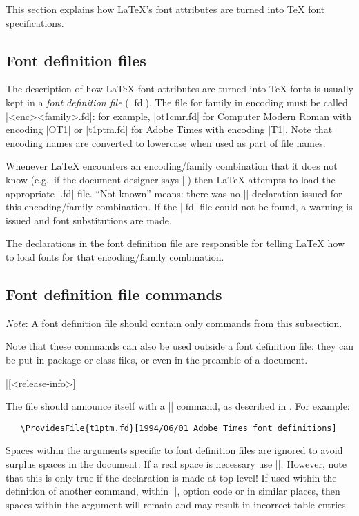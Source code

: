 \documentclass{ltxguide}[1995/11/28]
\begin{document}
This section explains how \LaTeX's font attributes are turned into
\TeX{} font specifications.

\subsection{Font definition files}

The description of how \LaTeX{} font attributes are turned into \TeX{}
fonts is usually kept in a \emph{font definition file} (|.fd|).  The
file for family  in encoding  must be called
|<enc><family>.fd|: for example, |ot1cmr.fd| for Computer Modern Roman
with encoding |OT1| or |t1ptm.fd| for Adobe Times with encoding |T1|.
Note that encoding names are converted to lowercase when used as part of
file names.

Whenever \LaTeX{} encounters an encoding/family combination that it does
not know (e.g.~if the document designer says
|\selectfont|) then \LaTeX{} attempts to load the
appropriate |.fd| file.  ``Not known'' means: there was no
|\DeclareFontFamily| declaration issued for this encoding/family
combination.  If the |.fd| file could not be found, a warning is issued
and font substitutions are made.

The declarations in the font definition file are responsible for telling
\LaTeX{} how to load fonts for that encoding/family combination.

\subsection{Font definition file commands}

\emph{Note}: A font definition file should contain only commands from
this subsection.

Note that these commands can also be used outside a font definition
file: they can be put in package or class files, or even in the preamble
of a document.

\begin{decl}
  |[<release-info>]|
\end{decl}
The file should announce itself with a |\ProvidesFile| command, as
described in \emph{\clsguide}.  For example:
\begin{verbatim}
   \ProvidesFile{t1ptm.fd}[1994/06/01 Adobe Times font definitions]
\end{verbatim}

Spaces within the arguments specific to font definition files are
ignored to avoid surplus spaces in the document. If a real space is
necessary use |\space|.
However, note that this is only true if the declaration is made at top
level! If used within the definition of another command, within
|\AtBeginDocument|, option code or in similar places, then spaces within
the argument will remain and may result in incorrect table entries.
\end{document}
